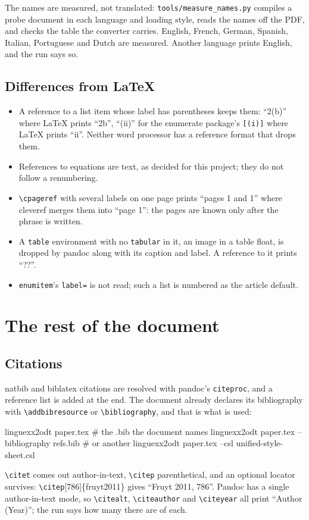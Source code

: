 \documentclass[11pt,a4paper]{article}
\newcommand{\cs}[1]{\texttt{\textbackslash #1}}
\newcommand{\file}[1]{\texttt{#1}}
\newcommand{\pkg}[1]{\textsf{#1}}
\begin{document}
The names are measured, not translated: \file{tools/measure\_names.py}
compiles a probe document in each language and loading style, reads the
names off the PDF, and checks the table the converter carries. English,
French, German, Spanish, Italian, Portuguese and Dutch are measured. Another
language prints English, and the run says so.

\subsection{Differences from \LaTeX}\label{sec:xref-diff}

\begin{itemize}
\item A reference to a list item whose label has parentheses keeps them:
  ``2(b)'' where \LaTeX{} prints ``2b'', ``(ii)'' for the \pkg{enumerate}
  package's \texttt{[(i)]} where \LaTeX{} prints ``ii''. Neither word
  processor has a reference format that drops them.
\item References to equations are text, as decided for this project; they do
  not follow a renumbering.
\item \cs{cpageref} with several labels on one page prints ``pages 1 and 1''
  where \pkg{cleveref} merges them into ``page 1'': the pages are known only
  after the phrase is written.
\item A \texttt{table} environment with no \texttt{tabular} in it, an image
  in a table float, is dropped by pandoc along with its caption and label. A
  reference to it prints ``??''.
\item \texttt{enumitem}'s \texttt{label=} is not read; such a list is
  numbered as the article default.
\end{itemize}

\section{The rest of the document}\label{sec:rest}

\subsection{Citations}

\pkg{natbib} and \pkg{biblatex} citations are resolved with pandoc's
\texttt{citeproc}, and a reference list is added at the end. The document
already declares its bibliography with \cs{addbibresource} or
\cs{bibliography}, and that is what is used:
\begin{code}
linguexx2odt paper.tex                           # the .bib the document names
linguexx2odt paper.tex --bibliography refs.bib   # or another
linguexx2odt paper.tex --csl unified-style-sheet.csl
\end{code}
\cs{citet} comes out author-in-text, \cs{citep} parenthetical, and an optional
locator survives: \cs{citep}[786]\{fruyt2011\} gives ``Fruyt 2011, 786''.
Pandoc has a single author-in-text mode, so \cs{citealt}, \cs{citeauthor}
and \cs{citeyear} all print ``Author (Year)''; the run says how many there
are of each.
\end{document}
